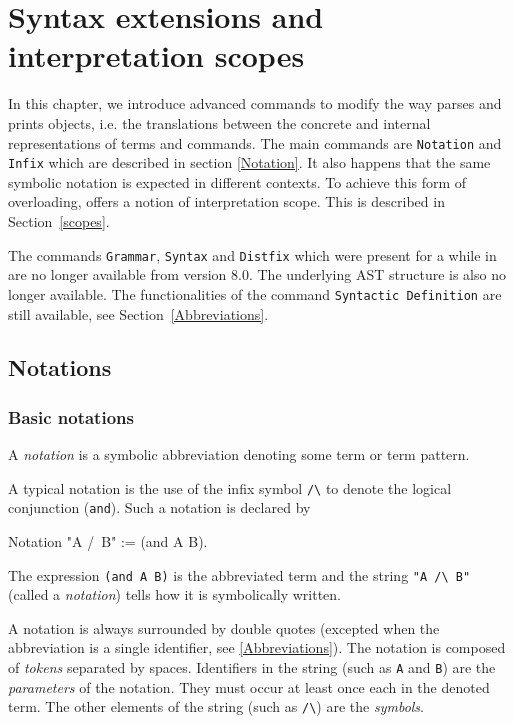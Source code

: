 \chapter[Syntax extensions and interpretation scopes]{Syntax extensions and interpretation scopes\label{Addoc-syntax}}

In this chapter, we introduce advanced commands to modify the way
{\Coq} parses and prints objects, i.e. the translations between the
concrete and internal representations of terms and commands. The main
commands are {\tt Notation} and {\tt Infix} which are described in
section \ref{Notation}.  It also happens that the same symbolic
notation is expected in different contexts. To achieve this form of
overloading, {\Coq} offers a notion of interpretation scope. This is
described in Section~\ref{scopes}.

\Rem The commands {\tt Grammar}, {\tt Syntax} and {\tt Distfix} which
were present for a while in {\Coq} are no longer available from {\Coq}
version 8.0. The underlying AST structure is also no longer available.
The functionalities of the command {\tt Syntactic Definition} are
still available, see Section~\ref{Abbreviations}.

\section[Notations]{Notations\label{Notation}
}

\subsection{Basic notations}

A {\em notation} is a symbolic abbreviation denoting some term
or term pattern.

A typical notation is the use of the infix symbol \verb=/\= to denote
the logical conjunction (\texttt{and}). Such a notation is declared
by

\begin{coq_example*}
Notation "A /\ B" := (and A B).
\end{coq_example*}

The expression \texttt{(and A B)} is the abbreviated term and the
string \verb="A /\ B"= (called a {\em notation}) tells how it is 
symbolically written.

A notation is always surrounded by double quotes (excepted when the
abbreviation is a single identifier, see \ref{Abbreviations}). The
notation is composed of {\em tokens} separated by spaces.  Identifiers
in the string (such as \texttt{A} and \texttt{B}) are the {\em
parameters} of the notation. They must occur at least once each in the
denoted term. The other elements of the string (such as \verb=/\=) are
the {\em symbols}.

